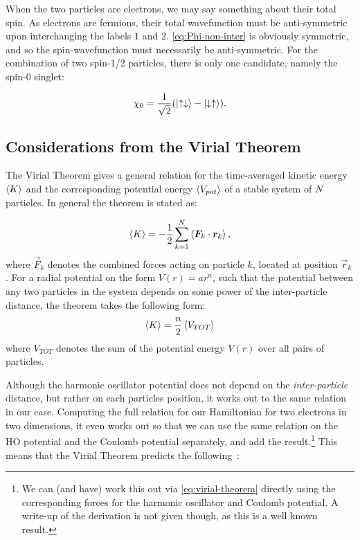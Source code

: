 \documentclass[a4paper, 11pt]{article}
\begin{document}
\begin{multicols}{2}
    When the two particles are electrons, we may say something about their total
    spin. As electrons are fermions, their total wavefunction must be
    anti-symmetric upon interchanging the labels $1$ and $2$.
    \autoref{eq:Phi-non-inter} is obviously symmetric, and so the
    spin-wavefunction must necessarily be anti-symmetric. For the combination of
    two spin-1/2 particles, there is only one candidate, namely the spin-0
    singlet:

    \begin{align}
        \chi_0 = \frac{1}{\sqrt 2}\qty(\ket{\uparrow\downarrow} -
        \ket{\downarrow\uparrow}).
    \end{align}

    \subsection{Considerations from the Virial Theorem}

    The Virial Theorem gives a general relation for the time-averaged kinetic
    energy $\expval{K}$ and the corresponding potential energy
    $\expval{V_{pot}}$ of a stable system of $N$ particles. In general the
    theorem is stated as:

    \begin{align}
        \expval{K} = -\frac{1}{2}\sum_{k=1}^N \expval{\bm F_k \cdot \bm r_k},\label{eq:virial-theorem}
    \end{align}
    where $\vec F_k$ denotes the combined forces acting on particle $k$, located
    at position $\vec r_k$. For a radial potential on the form $V(r)=ar^n$, such
    that the potential between any two particles in the system depends on some
    power of the inter-particle distance, the
    theorem takes the following form:
    \begin{align}
        \expval{K} = \frac{n}{2}\expval{V_{TOT}}
    \end{align}
    where $V_{TOT}$ denotes the sum of the potential energy $V(r)$ over all
    pairs of particles. 

    Although the harmonic oscillator potential does not depend on the
    \emph{inter-particle} distance, but rather on each particles position, it
    works out to the same relation in our case. Computing the full relation for
    our Hamiltonian for two electrons in two dimensions, it even works out so
    that we can use the same relation on the HO potential and the Coulomb
    potential separately, and add the result.\footnote{We can (and have) work this out
    via \autoref{eq:virial-theorem} directly using the corresponding forces for
    the harmonic oscillator and Coulomb potential. A write-up of the derivation is not given
    though, as this is a well known result.} This means that the Virial Theorem
    predicts the following~\cite{Katriel2012}:


\end{multicols}
\end{document}
